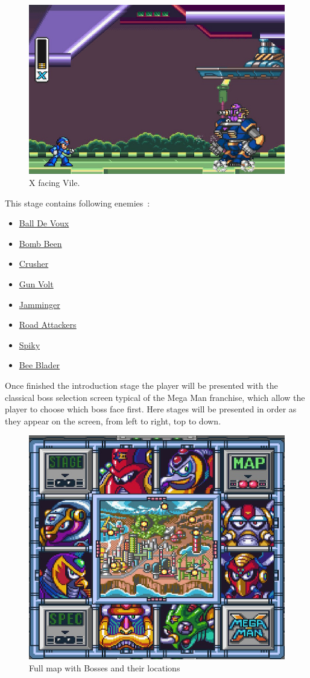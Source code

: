 \begin{figure}[htp]
	\centering
	\includegraphics[width=0.5\linewidth]{figures/X1/Highway_screenshot.jpg}
	\caption{X facing Vile.}
\end{figure}
This stage contains following enemies~\cite{wiki:Highway}:
\begin{itemize}
	\item \hyperlink{enem:Ball_De_Voux}{Ball De Voux }
	\item \hyperlink{enem:Bomb_Been}{Bomb Been }
	\item \hyperlink{enem:Crusher}{Crusher }
	\item \hyperlink{enem:Gun_Volt}{Gun Volt}
	\item \hyperlink{enem:Jamminger}{Jamminger}
	\item \hyperlink{enem:Road_Attackers}{Road Attackers }
	\item \hyperlink{enem:Spiky}{Spiky }
	\item \hyperlink{miniboss:Bee_Blader}{Bee Blader }
\end{itemize}


Once finished the introduction stage the player will be presented with the classical boss selection screen typical of the Mega Man franchise, which allow the player to choose which boss face first. Here stages will be presented in order as they appear on the screen, from left to right, top to down.
\begin{figure}[htp]
	\centering
	\includegraphics[width=0.5\linewidth]{figures/X1/Full_map.png}
	\caption{Full map with Bosses and their locations}
\end{figure}



